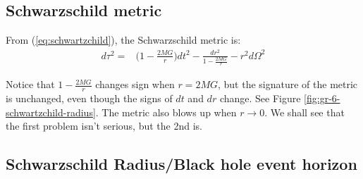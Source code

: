 \documentclass[]{article}
\begin{document}
{\subsection{Schwarzschild metric}

From (\ref{eq:schwartzchild}), the Schwarzschild metric is:
\begin{align*}
	d \tau^2 =&\bigg(1-\frac{2MG}{r}\bigg)dt^2-\frac{dr^2}{1-\frac{2MG}{r}} - r^2 d\Omega^2 
\end{align*}

Notice that $1-\frac{2MG}{r}$ changes sign when $r=2MG$, but the signature of the metric is unchanged, even though the signs of $dt$ and $dr$ change. See Figure \ref{fig:gr-6-schwartzchild-radius}. The metric also blows up when $r\rightarrow0$. We shall see that the first problem isn't serious, but the 2nd is.

\subsection{Schwarzschild Radius/Black hole event horizon}

}
\end{document}

